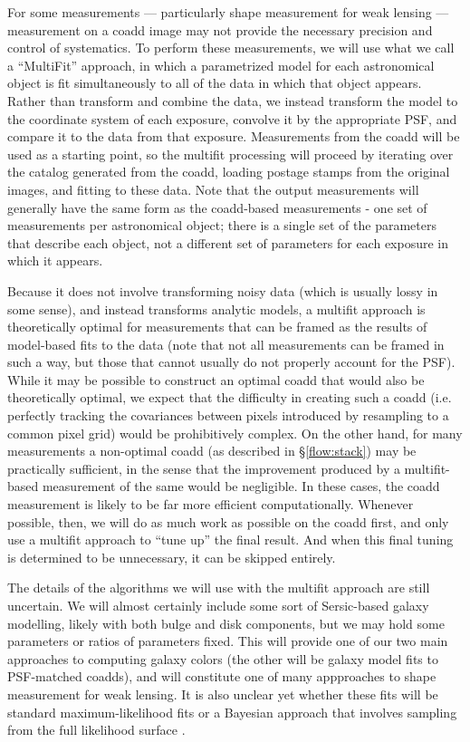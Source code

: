 \documentclass[12pt]{article}
\begin{document}
For some measurements --- particularly shape measurement for weak
lensing --- measurement on a coadd image may not provide the necessary
precision and control of systematics.  To perform these measurements,
we will use what we call a ``MultiFit'' approach, in which a
parametrized model for each astronomical object is fit simultaneously
to all of the data in which that object appears.  Rather than
transform and combine the data, we instead transform the model to the
coordinate system of each exposure, convolve it by the appropriate
PSF, and compare it to the data from that exposure.  Measurements from
the coadd will be used as a starting point, so the multifit processing
will proceed by iterating over the catalog generated from the coadd,
loading postage stamps from the original images, and fitting to these
data.  Note that the output measurements will generally have the same
form as the coadd-based measurements - one set of measurements per
astronomical object; there is a single set of the
parameters that describe each object, not a different set of parameters
for each exposure in which it appears.

Because it does not involve transforming noisy data (which is usually
lossy in some sense), and instead transforms analytic models, a
multifit approach is theoretically optimal for measurements that can
be framed as the results of model-based fits to the data (note that
not all measurements can be framed in such a way, but those that
cannot usually do not properly account for the PSF).  While it may be
possible to construct an optimal coadd that would also be
theoretically optimal, we expect that the difficulty in creating such
a coadd (i.e. perfectly tracking the covariances between pixels
introduced by resampling to a common pixel grid) would be prohibitively
complex.  On the other hand, for many measurements a non-optimal coadd
(as described in \S\ref{flow:stack}) may be practically
sufficient, in the sense that the improvement produced by a
multifit-based measurement of the same would be negligible.  In these
cases, the coadd measurement is likely to be far more efficient
computationally.  Whenever possible, then, we will do as much work as
possible on the coadd first, and only use a multifit approach to ``tune up''
the final result.  And when this final tuning is determined to be
unnecessary, it can be skipped entirely.

The details of the algorithms we will use with the multifit approach
are still uncertain.  We will almost certainly include some sort
of Sersic-based galaxy modelling, likely with both bulge and disk
components, but we may hold some parameters or ratios of parameters
fixed.  This will provide one of our two main approaches to
computing galaxy colors (the other will be galaxy model fits to
PSF-matched coadds), and will constitute one of many appproaches to
shape measurement for weak lensing.  It is also unclear yet whether
these fits will be standard maximum-likelihood fits or a Bayesian
approach that involves sampling from the full likelihood surface
\citep{BA2013,Miller2013}.
\end{document}
